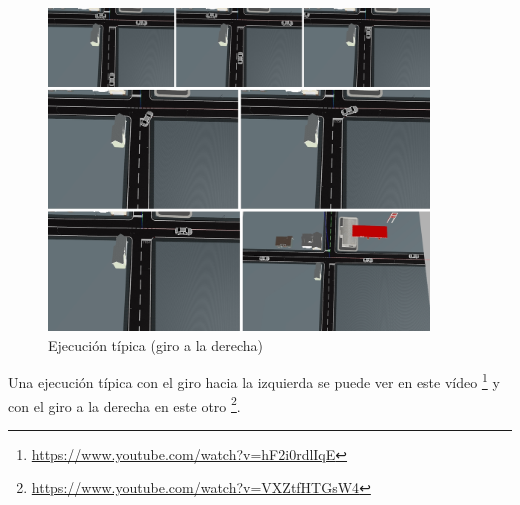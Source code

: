 \begin{figure}[H]
  \begin{center}
    \includegraphics[width=0.9\textwidth]{figures/Stop/ejecucionFinal.jpg}
		\caption{Ejecución típica (giro a la derecha)}
		\label{fig.ejecucionFinal}
		\end{center}
\end{figure}


Una ejecución típica con el giro hacia la izquierda se puede ver en este vídeo \footnote{\url{https://www.youtube.com/watch?v=hF2i0rdlIqE}} y con el giro a la derecha en este otro \footnote{\url{https://www.youtube.com/watch?v=VXZtfHTGsW4}}.
